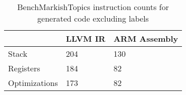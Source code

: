 \begin{table}[h!]
\centering
\begin{tabular}{p{}p{}p{}}
  \hline
 & LLVM IR & ARM Assembly \\ 
  \hline
Stack & 204 & 130 \\ 
  Registers & 184 &  82 \\ 
  Optimizations & 173 &  82 \\ 
   \hline
\end{tabular}
\caption{BenchMarkishTopics instruction counts for generated code excluding labels}
\end{table}
